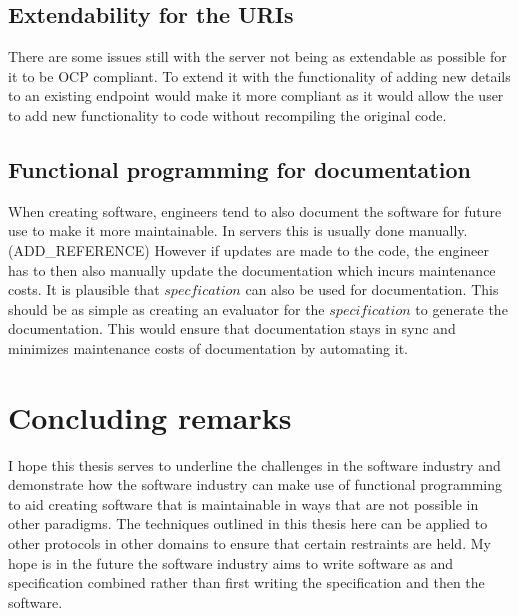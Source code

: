 \subsection{Extendability for the URIs}

There are some issues still with the server not being as extendable as possible
for it to be OCP compliant. To extend it with the functionality of adding new
details to an existing endpoint would make it more compliant as it would allow
the user to add new functionality to code without recompiling the original
code.

\subsection{Functional programming for documentation}

When creating software, engineers tend to also document the software for future
use to make it more maintainable. In servers this is usually done manually.
(ADD\_REFERENCE) However if updates are made to the code, the engineer has to
then also manually update the documentation which incurs maintenance costs. It
is plausible that $specfication$ can also be used for documentation. This
should be as simple as creating an evaluator for the $specification$ to
generate the documentation. This would ensure that documentation stays in sync
and minimizes maintenance costs of documentation by automating it.

\section{Concluding remarks}

I hope this thesis serves to underline the challenges in the software industry
and demonstrate how the software industry can make use of functional programming
to aid creating software that is maintainable in ways that are not possible in
other paradigms. The techniques outlined in this thesis here can be applied to
other protocols in other domains to ensure that certain restraints are held. My
hope is in the future the software industry aims to write software as and
specification combined rather than first writing the specification and then the
software. 
